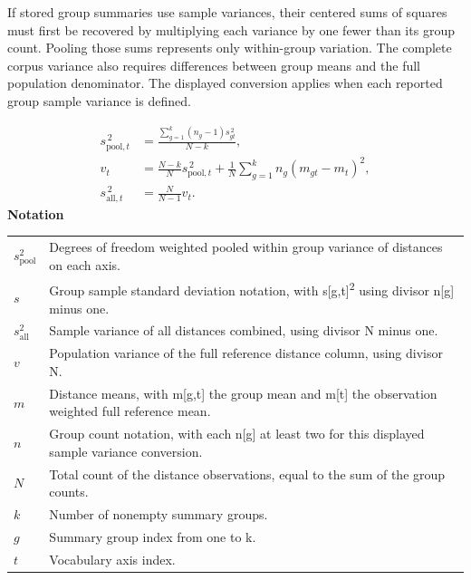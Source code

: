 \documentclass[10pt,letterpaper]{article}
\newcommand{\notlabel}{\noindent\textbf{Notation}\par\nobreak\vspace{4pt}}
\begin{document}
If stored group summaries use sample variances, their centered sums of squares must first be recovered by multiplying each variance by one fewer than its group count. Pooling those sums represents only within-group variation. The complete corpus variance also requires differences between group means and the full population denominator. The displayed conversion applies when each reported group sample variance is defined.\par

\par\noindent\begin{minipage}{\linewidth}
\begin{equation}\label{eq:pooledvarianceconversion}
\begin{aligned}s_{\mathrm{pool},t}^{\,2}&=\frac{\sum_{g=1}^{k}(n_g-1)s_{gt}^{\,2}}{N-k},\\v_t&=\frac{N-k}{N}s_{\mathrm{pool},t}^{\,2}+\frac1N\sum_{g=1}^{k}n_g(m_{gt}-m_t)^2,\\s_{\mathrm{all},t}^{\,2}&=\frac{N}{N-1}v_t.\end{aligned}
\end{equation}
\notlabel
{\fontsize{8.5}{10.5}\selectfont\setlength{\tabcolsep}{0pt}\renewcommand{\arraystretch}{1.12}
\begin{tabularx}{\linewidth}{@{}p{.14\linewidth}X@{}}
$s_{\mathrm{pool}}^{2}$ & Degrees of freedom weighted pooled within group variance of distances on each axis.\\
$s$ & Group sample standard deviation notation, with s[g,t]\textsuperscript{2} using divisor n[g] minus one.\\
$s_{\mathrm{all}}^{2}$ & Sample variance of all distances combined, using divisor N minus one.\\
$v$ & Population variance of the full reference distance column, using divisor N.\\
$m$ & Distance means, with m[g,t] the group mean and m[t] the observation weighted full reference mean.\\
$n$ & Group count notation, with each n[g] at least two for this displayed sample variance conversion.\\
$N$ & Total count of the distance observations, equal to the sum of the group counts.\\
$k$ & Number of nonempty summary groups.\\
$g$ & Summary group index from one to k.\\
$t$ & Vocabulary axis index.\\
\end{tabularx}}
\par\vspace{2pt}
\end{minipage}\par
\end{document}
